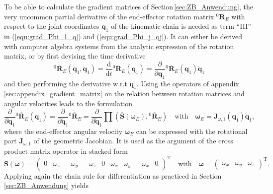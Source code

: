 \documentclass[robotics,article,accept,moreauthors,pdftex]{Definitions/mdpi}
\newcommand{\bm}[1]{\boldsymbol{#1}}
\newcommand{\rotmat}[2]{{{ }^{#1}\boldsymbol{R}}_{#2}}
\newcommand{\rotmato}[2]{{{ }^{#1}\boldsymbol{\overline{R}}}_{#2}}
\newcommand{\transp}[0]{{\mathrm{T}}}
\begin{document}
To be able to calculate the gradient matrices of Section\,\ref{sec:ZB_Anwendung}, the very uncommon partial derivative of the end-effector rotation matrix $\rotmat{0}{E}$ with respect to the joint coordinates $\bm{q}_1$ of the kinematic chain is needed as term ``III'' in (\ref{equ:grad_Phi_1_q}) and (\ref{equ:grad_Phi_j_qj}).
It can either be derived with computer algebra systems from the analytic expression of the rotation matrix, or by first devising the time derivative
%
\begin{equation}
\dot{\rotmato{0}{E}}(\bm{q}_1,\dot{\bm{q}}_1)
=
\frac{\mathrm{d}}{\mathrm{d}t} \rotmato{0}{E}(\bm{q}_1)
=
\frac{\partial}{\partial \bm{q}_1}
\rotmato{0}{E}(\bm{q}_1)
\dot{\bm{q}}_1
\end{equation}
%
and then performing the derivative w.r.t $\dot{\bm{q}}_1$.
Using the operators of appendix\,\ref{sec:appendix_gradient_matrix} on the relation between rotation matrices and angular velocities leads to the formulation
%
\begin{equation}
\frac{\partial}{\partial \bm{q}_1}
\rotmato{0}{E}(\bm{q}_1)
=
\frac{\partial}{\partial \dot{\bm{q}}_1}
\dot{\rotmato{0}{E}}
=
\frac{\partial}{\partial \dot{\bm{q}}_1}
\overline{\prod}\left( \overline{\bm{S}}(\bm{\omega}_E), \rotmato{0}{E}\right)
\quad
\mathrm{with}
\quad
\bm{\omega}_E = \bm{J}_{\omega,1}(\bm{q}_1) \dot{\bm{q}}_1,
\end{equation}
%
where the end-effector angular velocity $\bm{\omega}_E$ can be expressed with the rotational part $\bm{J}_{\omega,1}$ of the geometric Jacobian.
It is used as the argument of the cross product matrix operator in stacked form
%
\begin{equation}
\overline{\bm{S}}
(\bm{\omega})=
\begin{pmatrix} 0 &  \omega_z& -\omega_y &
-\omega_z&0& \omega_x &
 \omega_y&- \omega_x&0
\end{pmatrix}^\transp
\quad
\mathrm{with}
\quad
\bm{\omega}
=
\begin{pmatrix}
\omega_x & \omega_y & \omega_z
\end{pmatrix}^\transp.
\label{equ:skew_stacked_operator}
\end{equation}
%
Applying again the chain rule for differentiation as practiced in Section\,\ref{sec:ZB_Anwendung} yields
%
\end{document}
